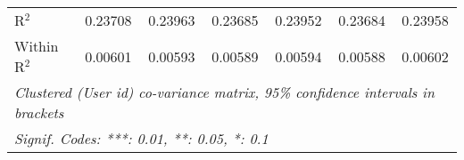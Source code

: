 \begin{table}[htbp]
\begin{threeparttable}[b]
\begin{tabular}{lcccccc}
         R$^2$                           & 0.23708          & 0.23963          & 0.23685          & 0.23952          & 0.23684          & 0.23958\\  
         Within R$^2$                    & 0.00601          & 0.00593          & 0.00589          & 0.00594          & 0.00588          & 0.00602\\  
         \midrule \midrule
         \multicolumn{7}{l}{\emph{Clustered (User id) co-variance matrix, 95\% confidence intervals in brackets}}\\
         \multicolumn{7}{l}{\emph{Signif. Codes: ***: 0.01, **: 0.05, *: 0.1}}\\
      \end{tabular}
   \end{threeparttable}
\end{table}


